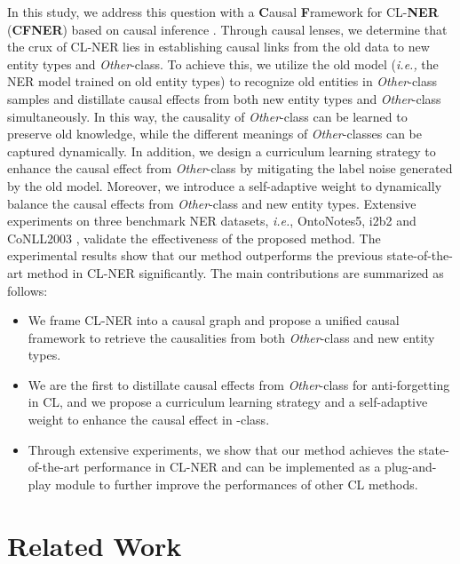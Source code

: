 \documentclass[11pt]{article}
\begin{document}
In this study, we address this question with a \textbf{C}ausal \textbf{F}ramework for CL-\textbf{NER} (\textbf{CFNER}) based on causal inference \citep{glymour2016causal,scholkopf2022causality}. 
Through causal lenses, we determine that the crux of CL-NER lies in establishing causal links from the old data to new entity types and \textit{Other}-class.
To achieve this, we utilize the old model (\textit{i.e.,} the NER model trained on old entity types) to recognize old entities in \textit{Other}-class samples and distillate causal effects \citep{glymour2016causal} from both new entity types and \textit{Other}-class simultaneously.
In this way, the causality of \textit{Other}-class can be learned to preserve old knowledge, while the different meanings of \textit{Other}-classes can be captured dynamically.
In addition, we design a curriculum learning \citep{bengio2009curriculum} strategy to enhance the causal effect from \textit{Other}-class by mitigating the label noise generated by the old model.
Moreover, we introduce a self-adaptive weight to dynamically balance the causal effects from \textit{Other}-class and new entity types.
Extensive experiments on three benchmark NER datasets, \textit{i.e.}, OntoNotes5, i2b2 \citep{murphy2010serving} and CoNLL2003 \citep{sang2003introduction}, validate the effectiveness of the proposed method.
The experimental results show that our method outperforms the previous state-of-the-art method in CL-NER significantly. The main contributions are summarized as follows:
\begin{itemize}
    \item We frame CL-NER into a causal graph \citep{pearl2009causality} and propose a unified causal framework to retrieve the causalities from both \textit{Other}-class and new entity types.
    \item We are the first to distillate causal effects from \textit{Other}-class for anti-forgetting in CL, and we propose a curriculum learning strategy and a self-adaptive weight to enhance the causal effect in -class.
    \item Through extensive experiments, we show that our method achieves the state-of-the-art performance in CL-NER and can be implemented as a plug-and-play module to further improve the performances of other CL methods.
\end{itemize}

\section{Related Work}
\end{document}
